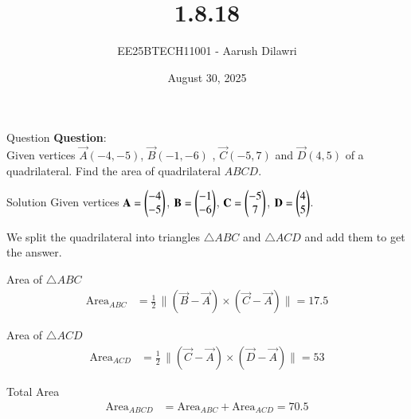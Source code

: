 \documentclass{beamer}
\title{1.8.18}
\date{August 30, 2025}
\author{EE25BTECH11001 - Aarush Dilawri}
\begin{document}
\begin{frame}
\titlepage
\end{frame}

\begin{frame}{Question}
\textbf{Question}:\\
Given vertices $\vec{A}(-4,-5)$, $\vec{B}(-1,-6)$ , $\vec{C}(-5,7)$ and $\vec{D}(4,5)$ of a quadrilateral.  
Find the area of quadrilateral $ABCD$.
\end{frame}

\begin{frame}{Solution}
Given vertices $\mathbf{A}=\begin{pmatrix}-4\\-5\end{pmatrix}$, $\mathbf{B}=\begin{pmatrix}-1\\-6\end{pmatrix}$,  
$\mathbf{C}=\begin{pmatrix}-5\\7\end{pmatrix}$, $\mathbf{D}=\begin{pmatrix}4\\5\end{pmatrix}$.  

We split the quadrilateral into triangles $\triangle ABC$ and $\triangle ACD$  
and add them to get the answer.
\end{frame}

\begin{frame}{Area of $\triangle ABC$}
\begin{align}
\text{Area}_{ABC}
&= \tfrac{1}{2}\,\big\lVert (\vec{B}-\vec{A}) \times (\vec{C}-\vec{A}) \big\rVert = 17.5
\end{align}
\end{frame}

\begin{frame}{Area of $\triangle ACD$}
\begin{align}
\text{Area}_{ACD}
&= \tfrac{1}{2}\,\big\lVert (\vec{C}-\vec{A}) \times (\vec{D}-\vec{A}) \big\rVert = 53
\end{align}
\end{frame}

\begin{frame}{Total Area}
\begin{align}
\text{Area}_{ABCD} &= \text{Area}_{ABC} + \text{Area}_{ACD} = 70.5
\end{align}
\end{frame}
\end{document}
